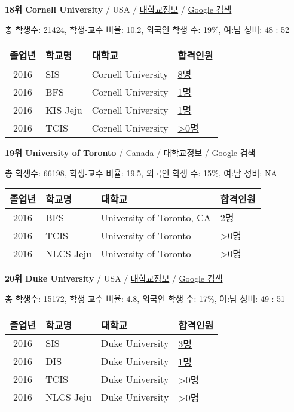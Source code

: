 \documentclass[13pt,]{article}
\begin{document}
\textbf{18위 Cornell University} / USA /
\href{https://www.timeshighereducation.com/world-university-rankings/cornell-university?ranking-dataset=133819}{대학교정보}
/ \href{http://www.google.com/search?q=Cornell+University}{Google 검색}

총 학생수: 21424, 학생-교수 비율: 10.2, 외국인 학생 수: 19\%, 여:남
성비: 48 : 52

\begin{longtable}[]{@{}clll@{}}
\toprule
졸업년 & 학교명 & 대학교 & 합격인원\tabularnewline
\midrule
\endhead
2016 & SIS & Cornell University &
\href{http://cafe.naver.com/assarabia/11589}{8명}\tabularnewline
2016 & BFS & Cornell University &
\href{http://cafe.naver.com/assarabia/11597}{1명}\tabularnewline
2016 & KIS Jeju & Cornell University &
\href{http://cafe.naver.com/assarabia/11596}{1명}\tabularnewline
2016 & TCIS & Cornell University &
\href{http://cafe.naver.com/assarabia/11598}{\textgreater{}0명}\tabularnewline
\bottomrule
\end{longtable}

\textbf{19위 University of Toronto} / Canada /
\href{https://www.timeshighereducation.com/world-university-rankings/university-of-toronto?ranking-dataset=133819}{대학교정보}
/ \href{http://www.google.com/search?q=University+of+Toronto}{Google
검색}

총 학생수: 66198, 학생-교수 비율: 19.5, 외국인 학생 수: 15\%, 여:남
성비: NA

\begin{longtable}[]{@{}clll@{}}
\toprule
졸업년 & 학교명 & 대학교 & 합격인원\tabularnewline
\midrule
\endhead
2016 & BFS & University of Toronto, CA &
\href{http://cafe.naver.com/assarabia/11597}{2명}\tabularnewline
2016 & TCIS & University of Toronto &
\href{http://cafe.naver.com/assarabia/11598}{\textgreater{}0명}\tabularnewline
2016 & NLCS Jeju & University of Toronto &
\href{http://cafe.naver.com/assarabia/11592}{\textgreater{}0명}\tabularnewline
\bottomrule
\end{longtable}

\textbf{20위 Duke University} / USA /
\href{https://www.timeshighereducation.com/world-university-rankings/duke-university?ranking-dataset=133819}{대학교정보}
/ \href{http://www.google.com/search?q=Duke+University}{Google 검색}

총 학생수: 15172, 학생-교수 비율: 4.8, 외국인 학생 수: 17\%, 여:남 성비:
49 : 51

\begin{longtable}[]{@{}clll@{}}
\toprule
졸업년 & 학교명 & 대학교 & 합격인원\tabularnewline
\midrule
\endhead
2016 & SIS & Duke University &
\href{http://cafe.naver.com/assarabia/11589}{3명}\tabularnewline
2016 & DIS & Duke University &
\href{http://cafe.naver.com/assarabia/11591}{1명}\tabularnewline
2016 & TCIS & Duke University &
\href{http://cafe.naver.com/assarabia/11598}{\textgreater{}0명}\tabularnewline
2016 & NLCS Jeju & Duke University &
\href{http://cafe.naver.com/assarabia/11592}{\textgreater{}0명}\tabularnewline
\bottomrule
\end{longtable}
\end{document}
